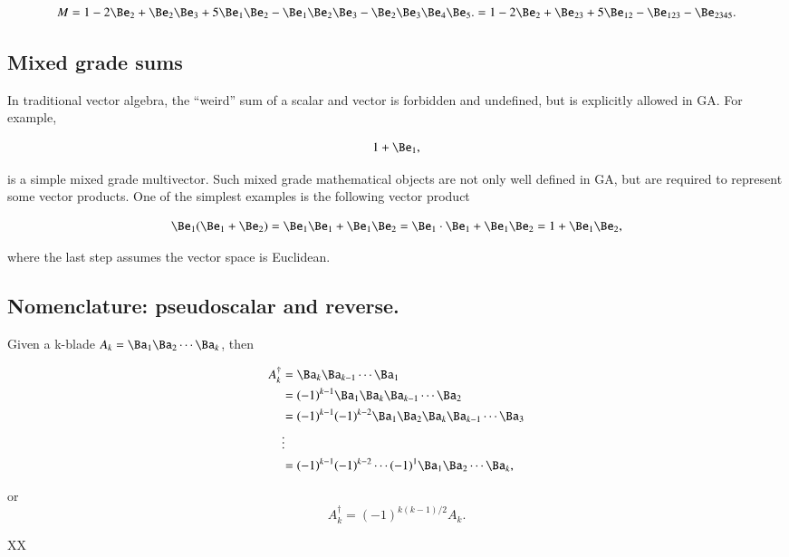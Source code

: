 \begin{dmath}\label{eqn:SimpleProducts:120}
M = 1 - 2 \Be_2  + \Be_2 \Be_3 + 5 \Be_1 \Be_2 - \Be_1 \Be_2 \Be_3 -\Be_2 \Be_3 \Be_4 \Be_5.
  = 1 - 2 \Be_2  + \Be_{23} + 5 \Be_{12} - \Be_{123} -\Be_{2345}.
\end{dmath}

\subsection{Mixed grade sums}
In traditional vector algebra, the
``weird'' sum of a scalar and vector is forbidden and undefined, but is explicitly allowed in GA.  For example,

\begin{dmath}\label{eqn:multivector:240}
1 + \Be_1,
\end{dmath}

is a simple mixed grade multivector.
Such mixed grade mathematical objects are not only well defined in GA, but are required to represent some vector products.  One of the simplest examples is the following vector product

\begin{dmath}\label{eqn:multivector:260}
\Be_1 ( \Be_1 + \Be_2 )
=
\Be_1 \Be_1 + \Be_1 \Be_2
=
\Be_1 \cdot \Be_1 + \Be_1 \Be_2
=
1 + \Be_1 \Be_2,
\end{dmath}

where the last step assumes the vector space is Euclidean.

\subsection{Nomenclature: pseudoscalar and reverse.}



Given a k-blade \( A_k = \Ba_1 \Ba_2 \cdots \Ba_k \), then

\begin{dmath}\label{eqn:scalarPermutation:81}
\begin{aligned}
A_k^\dagger
&= \Ba_k \Ba_{k-1} \cdots \Ba_1 \\
&= (-1)^{k-1} \Ba_1 \Ba_k \Ba_{k-1} \cdots \Ba_2 \\
&= (-1)^{k-1} (-1)^{k-2} \Ba_1 \Ba_2 \Ba_k \Ba_{k-1} \cdots \Ba_3 \\
&\vdots \\
&= (-1)^{k-1} (-1)^{k-2} \cdots (-1)^1 \Ba_1 \Ba_2 \cdots \Ba_k,
\end{aligned}
\end{dmath}

or
\begin{dmath}\label{eqn:scalarPermutation:101}
A_k^\dagger = (-1)^{k(k-1)/2} A_k.
\end{dmath}

XX
